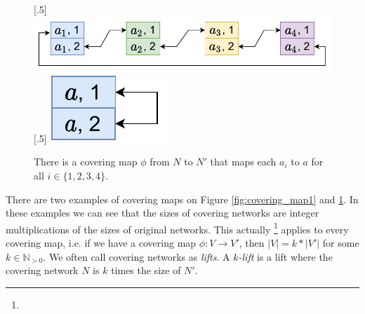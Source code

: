 \begin{figure}[H]
    [.5\linewidth] {
    \centering
    \includegraphics[scale=0.55]{diagrams/covering_map_3.pdf}
  }
  \hfill
    [.5\linewidth] {
    \centering
    \includegraphics[scale=0.55]{diagrams/covering_map_4.pdf}
  }
  \caption{There is a covering map $\phi$ from $N$ to $N'$ that maps each $a_i$ to $a$ for all $i \in \{1, 2, 3, 4\}$.
  }
  \label{fig:covering_map2}
\end{figure}

There are two examples of covering maps on Figure \ref{fig:covering_map1} and \ref{fig:covering_map2}.
In these examples we can see that the sizes of covering networks are integer multiplications of the sizes of original networks.
This actually
\footnote{}
applies to every covering map, i.e. if we have a covering map $\phi: V \rightarrow V'$, then $|V| = k*|V'|$ for some $k \in \mathbb{N}_{>0}$.
We often call covering networks as \emph{lifts}.
A \emph{$k$-lift} is a lift where the covering network $N$ is $k$ times the size of $N'$.




